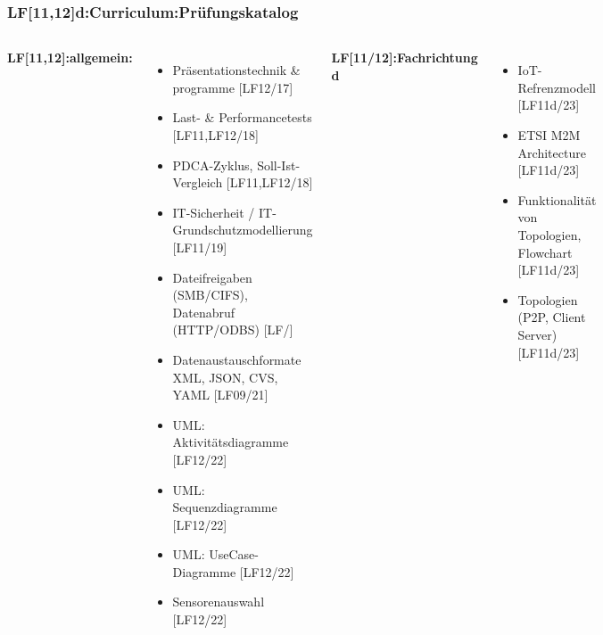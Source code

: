 

\begin{frame}
  \frametitle{LF[11,12]d:Curriculum:Prüfungskatalog}
  \begin{tiny}
  \begin{columns}[T]
    \textbf{LF[11,12]:allgemein:}
    \begin{itemize}
      \item[\faSquareO] Präsentationstechnik \& programme [LF12/17]
      \item[\faSquareO] Last- \& Performancetests [LF11,LF12/18]
      \item[\faSquareO] PDCA-Zyklus, Soll-Ist-Vergleich [LF11,LF12/18]
      \item[\faSquareO] IT-Sicherheit / IT-Grundschutzmodellierung [LF11/19]
      \item[\faSquareO] Dateifreigaben (SMB/CIFS), Datenabruf (HTTP/ODBS)  [LF/]
      \item[\faSquareO] Datenaustauschformate XML, JSON, CVS, YAML [LF09/21]
      \item[\faSquareO] UML: Aktivitätsdiagramme [LF12/22]
      \item[\faSquareO] UML: Sequenzdiagramme [LF12/22]
      \item[\faSquareO] UML: UseCase-Diagramme [LF12/22]
      \item[\faSquareO] Sensorenauswahl [LF12/22]
    \end{itemize}
    \textbf{LF[11/12]:Fachrichtung d}
    \begin{itemize}
      \item[\faSquareO] IoT-Refrenzmodell [LF11d/23]
      \item[\faSquareO] ETSI M2M Architecture  [LF11d/23]
      \item[\faSquareO] Funktionalität von Topologien, Flowchart [LF11d/23]
      \item[\faSquareO] Topologien (P2P, Client Server) [LF11d/23]

\end{itemize}
\end{columns}
\end{tiny}
\end{frame}
